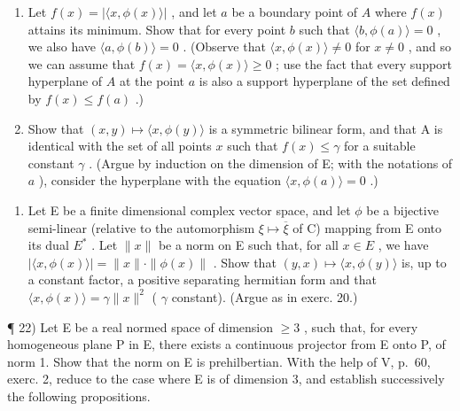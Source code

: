 \begin{enumerate}
\def\labelenumi{\alph{enumi})}
\item
  Let \(f(x) = |\langle x, \phi(x) \rangle|\) , and let \(a\) be a boundary point of \(A\) where \(f(x)\) attains its minimum. Show that for every point \(b\) such that \(\langle b, \phi(a) \rangle = 0\) , we also have \(\langle a, \phi(b) \rangle = 0\) . (Observe that \(\langle x, \phi(x) \rangle \neq 0\) for \(x \neq 0\) , and so we can assume that \(f(x) = \langle x, \phi(x) \rangle \geqslant 0\) ; use the fact that every support hyperplane of \(A\) at the point \(a\) is also a support hyperplane of the set defined by \(f(x) \leqslant f(a)\) .)
\item
  Show that \((x, y) \mapsto \langle x, \phi(y) \rangle\) is a symmetric bilinear form, and that A is identical with the set of all points \(x\) such that \(f(x) \leqslant \gamma\) for a suitable constant \(\gamma\) . (Argue by induction on the dimension of E; with the notations of \(a\) ), consider the hyperplane with the equation \(\langle x, \phi(a) \rangle = 0\) .)
\end{enumerate}

\begin{enumerate}
\def\labelenumi{\arabic{enumi})}
\setcounter{enumi}{20}
\tightlist
\item
  Let E be a finite dimensional complex vector space, and let \(\phi\) be a bijective semi-linear (relative to the automorphism \(\xi \mapsto \overline{\xi}\) of C) mapping from E onto its dual \(E^{*}\) . Let \(\| x\|\) be a norm on E such that, for all \(x \in E\) , we have \(|\langle x, \phi(x) \rangle| = \| x\| \cdot \| \phi(x)\|\) . Show that \((y, x) \mapsto \langle x, \phi(y) \rangle\) is, up to a constant factor, a positive separating hermitian form and that \(\langle x, \phi(x) \rangle = \gamma \| x\|^2\) ( \(\gamma\) constant). (Argue as in exerc. 20.)
\end{enumerate}

¶ 22) Let E be a real normed space of dimension \(\geqslant 3\) , such that, for every homogeneous plane P in E, there exists a continuous projector from E onto P, of norm 1. Show that the norm on E is prehilbertian. With the help of V, p.~60, exerc. 2, reduce to the case where E is of dimension 3, and establish successively the following propositions.

